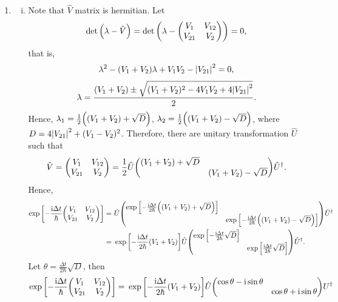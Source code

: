 \documentclass{article}
\newcommand{\iu}{\ensuremath{\mathrm{i}}}
\begin{document}
\begin{enumerate}[1.]
  \item \begin{enumerate}[(i)]
    \item Note that $\hat{V}$ matrix is hermitian. Let
    \begin{align*}
      \det\qty(\lambda - \hat{V}) = \det\qty(\lambda - \mqty(V_1 & V_{12} \\ V_{21} & V_2)) = 0,
    \end{align*}
    that is, \begin{align*}
      \lambda^2 - (V_1 + V_2) \lambda + V_1 V_2 - \abs{V_{21}}^2 = 0,
    \end{align*}
    \begin{align*}
      \lambda = \frac{(V_1 + V_2) \pm \sqrt{(V_1 + V_2)^2 - 4V_1 V_2 + 4\abs{V_{21}}^2 }}{2}.
    \end{align*}
    Hence, $\lambda_1 = \frac{1}{2}\qty((V_1 + V_2) + \sqrt{D})$, $\lambda_2 = \frac{1}{2}\qty((V_1 + V_2) - \sqrt{D})$, 
    where $D = 4\abs{V_{21}}^2 + (V_1 - V_2)^2$. Therefore, there are unitary transformation $\hat{U}$ such that
    \begin{align*}
      \hat{V} = \mqty(V_1 & V_{12} \\ V_{21} & V_2) = \frac{1}{2} \hat{U}\mqty((V_1 + V_2) + \sqrt{D} & \\ &(V_1 + V_2) - \sqrt{D}) \hat{U}^{\dagger}.
    \end{align*}
    Hence,
    \begin{align*}
      \exp\qty[-\frac{\iu\Delta t}{\hbar} \mqty(V_1 & V_{12} \\ V_{21} & V_2)] 
      =&\ \hat{U} \mqty(\exp\qty[-\frac{\iu\Delta t}{2\hbar} \qty((V_1 + V_2) + \sqrt{D})] & \\ & \exp\qty[-\frac{\iu\Delta t}{2\hbar} \qty((V_1 + V_2) - \sqrt{D})]) \hat{U}^{\dagger} \\
      =&\ \exp\qty[-\frac{\iu\Delta t}{2\hbar}\qty(V_1 + V_2)] \hat{U} \mqty(\exp\qty[-\frac{\iu\Delta t}{2\hbar} \sqrt{D}] & \\ & \exp\qty[\frac{\iu\Delta t}{2\hbar} \sqrt{D}]) \hat{U}^{\dagger}.
    \end{align*}
    Let $\theta = \frac{\Delta t}{2\hbar} \sqrt{D}$, then
    \begin{align*}
      \exp\qty[-\frac{\iu\Delta t}{\hbar} \mqty(V_1 & V_{12} \\ V_{21} & V_2)] 
      =& \ \exp\qty[-\frac{\iu\Delta t}{2\hbar}\qty(V_1 + V_2)] \hat{U} \mqty(\cos\theta - \iu\sin\theta & \\ & \cos\theta + \iu\sin\theta) U^{\dagger} \\

\end{align*}
\end{enumerate}
\end{enumerate}
\end{document}
